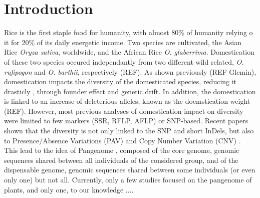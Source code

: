 \documentclass[10pt,letterpaper]{article}
\begin{document}
\section*{Introduction}
Rice is the first staple food for humanity, with almost 80\% of humanity relying o it for 20\% of its daily energetic income. Two species are cultivated, the Asian Rice \textit{Oryza sativa}, worldwide, and the African Rice \textit{O. glaberrima}. Domestication of these two species occured independantly from two different wild related, \textit{O. rufipogon} and \textit{O. barthii}, respectively (REF). As shown previously (REF Glemin), domestication impacts the diversity of the domesticated species, reducing it drasticly \cite{Cubry2018}, through founder effect and genetic drift. In addition, the domestication is linked to an increase of deleterious alleles, known as the doemstication weight (REF).
However, most previous analyses of domestication impact on diversity were limited to few markers (SSR, RFLP, AFLP) or SNP-based. Recent papers \cite{REFpangenome} shown that the diversity is not only linked to the SNP and short InDels, but also to Presence/Absence Variations (PAV) and Copy Number Variation (CNV) \cite{Tranchand2019}. This lead to the idea of Pangenome \cite{Tettelin2005, Tranchant2019}, composed of the core genome, genomic sequences shared between all individuals of the considered group, and of the dispensable genome, genomic sequences shared between some individuals (or even only one) but not all. Currently, only a few studies focused on the pangenome of plants, and only one, to our knowledge \cite{Han2018}....
\end{document}
